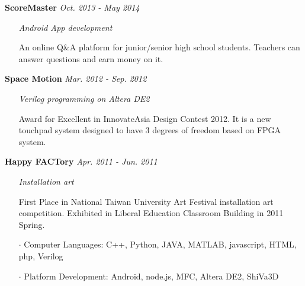 \documentclass{joel_cv}
\begin{document}
%
\noindent \hspace{1.2em}
{\bf ScoreMaster} \hfill {\em Oct. 2013 - May 2014}
\vspace{-0.5em}
\begin{itemize}[leftmargin=1.5em] \item[] {\em Android App development} \end{itemize}
\vspace{-0.5em}
\begin{itemize}[leftmargin=1.5em]
	\itemsep=-0.5em
	\item[] An online Q\&A platform for junior/senior high school students. Teachers can answer questions and earn money on it.
\end{itemize}

%
\noindent \hspace{1.2em}
{\bf Space Motion} \hfill {\em Mar. 2012 - Sep. 2012}
\vspace{-0.5em}
\begin{itemize}[leftmargin=1.5em] \item[] {\em Verilog programming on Altera DE2 } \end{itemize}
\vspace{-0.5em}
\begin{itemize}[leftmargin=1.5em]
	\itemsep=-0.5em
	\item[] Award for Excellent in InnovateAsia Design Contest 2012. It is a new touchpad system designed to have 3 degrees of freedom based on FPGA system.
\end{itemize}

%
\noindent \hspace{1.2em}
{\bf Happy FACTory} \hfill {\em Apr. 2011 - Jun. 2011}
\vspace{-0.5em}
\begin{itemize}[leftmargin=1.5em] \item[] {\em Installation art} \end{itemize}
\vspace{-0.5em}
\begin{itemize}[leftmargin=1.5em]
	\itemsep=-0.5em
	\item[] First Place in National Taiwan University Art Festival installation art competition. Exhibited in Liberal Education Classroom Building in 2011 Spring.
\end{itemize}


%
%

\vspace{1em}

\begin{itemize}
	\itemsep=-0.5em
	\item[$\cdot$] Computer Languages: C++, Python, JAVA, MATLAB, javascript, HTML, php, Verilog
	\item[$\cdot$] Platform Development: Android, node.js, MFC, Altera DE2, ShiVa3D
\end{itemize}
\end{document}
